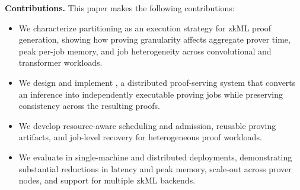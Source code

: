 \noindent\textbf{Contributions.}
This paper makes the following contributions:
\begin{itemize}[leftmargin=*,topsep=2pt,itemsep=2pt,parsep=0pt,partopsep=0pt]
    \item We characterize partitioning as an execution strategy for zkML proof generation, showing how proving granularity affects aggregate prover time, peak per-job memory, and job heterogeneity across convolutional and transformer workloads.

    \item We design and implement \TITLE{}, a distributed proof-serving system that converts an inference into independently executable proving jobs while preserving consistency across the resulting proofs.

    \item We develop resource-aware scheduling and admission, reusable proving artifacts, and job-level recovery for heterogeneous proof workloads.

    \item We evaluate \TITLE{} in single-machine and distributed deployments, demonstrating substantial reductions in latency and peak memory, scale-out across prover nodes, and support for multiple zkML backends.
\end{itemize}